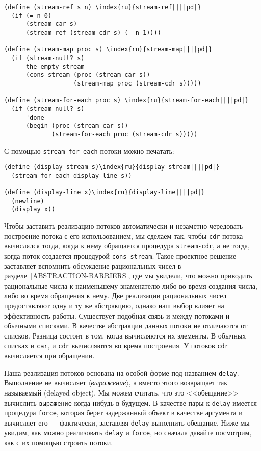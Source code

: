 \begin{Verbatim}[fontsize=\small]
(define (stream-ref s n) \index{ru}{stream-ref||||pd|}
  (if (= n 0)
      (stream-car s)
      (stream-ref (stream-cdr s) (- n 1))))

(define (stream-map proc s) \index{ru}{stream-map||||pd|}
  (if (stream-null? s)
      the-empty-stream
      (cons-stream (proc (stream-car s))
                   (stream-map proc (stream-cdr s)))))

(define (stream-for-each proc s) \index{ru}{stream-for-each||||pd|}
  (if (stream-null? s)
      'done
      (begin (proc (stream-car s))
             (stream-for-each proc (stream-cdr s)))))
\end{Verbatim}

С помощью {\tt stream-for-each} потоки можно печатать:

\begin{Verbatim}[fontsize=\small]
(define (display-stream s)\index{ru}{display-stream||||pd|}
  (stream-for-each display-line s))

(define (display-line x)\index{ru}{display-line||||pd|}
  (newline)
  (display x))
\end{Verbatim}


Чтобы заставить реализацию потоков автоматически и
незаметно чередовать построение потока с его использованием, мы
сделаем так, чтобы {\tt cdr} потока вычислялся тогда, когда к
нему обращается процедура {\tt stream-cdr}, а не тогда, когда
поток создается процедурой {\tt cons-stream}.  Такое проектное
решение заставляет вспомнить обсуждение рациональных чисел в
разделе~\ref{ABSTRACTION-BARRIERS}, где мы увидели, что можно
приводить рациональные числа к наименьшему знаменателю
либо во время создания числа, либо во время обращения к нему.  Две
реализации рациональных чисел предоставляют одну и ту же абстракцию,
однако наш выбор влияет на эффективность работы.  Существует подобная
связь и между потоками и обычными списками.  В качестве абстракции
данных потоки не отличаются от списков.  Разница состоит в том, когда
вычисляются их элементы.  В обычных списках и {\tt car}, и
{\tt cdr} вычисляются во время построения.  У потоков
{\tt cdr} вычисляется при обращении.

Наша реализация потоков основана на особой форме под
названием {\tt delay}.  Выполнение
 не вычисляет
\textit{$\langle$выражение$\rangle$}, а вместо этого возвращает так называемый
 (delayed object).  Мы можем
считать, что это <<обещание>> вычислить {\tt выражение}
когда-нибудь в будущем.  В качестве пары к {\tt delay} имеется
процедура {\tt force},
которая берет задержанный объект в
качестве аргумента и вычисляет его --- фактически, заставляя
{\tt delay} выполнить обещание.  Ниже мы увидим, как можно
реализовать {\tt delay} и {\tt force}, но сначала
давайте посмотрим, как с их помощью строить потоки.

